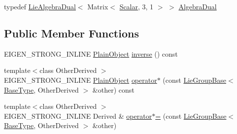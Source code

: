 \begin{DoxyCompactItemize}
\item 
typedef \hyperlink{class_lie_algebra_dual}{Lie\+Algebra\+Dual}$<$ Matrix$<$ \hyperlink{class_lie_group_base_3_01_quaternion_3_01typename_01internal_1_1traits_3_01_derived_01_4_1_1_scalar_01_4_00_01_derived_01_4_afadeceb3b98e52deecc572e71efb82a8}{Scalar}, 3, 1 $>$ $>$ \hyperlink{class_lie_group_base_3_01_quaternion_3_01typename_01internal_1_1traits_3_01_derived_01_4_1_1_scalar_01_4_00_01_derived_01_4_a2ae739f86fece047d4d480127d5b5d55}{Algebra\+Dual}
\end{DoxyCompactItemize}
\subsection*{Public Member Functions}
\begin{DoxyCompactItemize}
\item 
E\+I\+G\+E\+N\+\_\+\+S\+T\+R\+O\+N\+G\+\_\+\+I\+N\+L\+I\+NE \hyperlink{class_lie_group_base_3_01_quaternion_3_01typename_01internal_1_1traits_3_01_derived_01_4_1_1_scalar_01_4_00_01_derived_01_4_aadda973938291d3ccd25e606c6333a27}{Plain\+Object} \hyperlink{class_lie_group_base_3_01_quaternion_3_01typename_01internal_1_1traits_3_01_derived_01_4_1_1_scalar_01_4_00_01_derived_01_4_a676cfe6122660901eb50d0906d410812}{inverse} () const
\item 
{\footnotesize template$<$class Other\+Derived $>$ }\\E\+I\+G\+E\+N\+\_\+\+S\+T\+R\+O\+N\+G\+\_\+\+I\+N\+L\+I\+NE \hyperlink{class_lie_group_base_3_01_quaternion_3_01typename_01internal_1_1traits_3_01_derived_01_4_1_1_scalar_01_4_00_01_derived_01_4_aadda973938291d3ccd25e606c6333a27}{Plain\+Object} \hyperlink{class_lie_group_base_3_01_quaternion_3_01typename_01internal_1_1traits_3_01_derived_01_4_1_1_scalar_01_4_00_01_derived_01_4_ae0f90a992d5c96f69839a1f77bf95299}{operator$\ast$} (const \hyperlink{class_lie_group_base}{Lie\+Group\+Base}$<$ \hyperlink{class_lie_group_base_3_01_quaternion_3_01typename_01internal_1_1traits_3_01_derived_01_4_1_1_scalar_01_4_00_01_derived_01_4_a1a65624391a6a8eb63eb312f919c4855}{Base\+Type}, Other\+Derived $>$ \&other) const
\item 
{\footnotesize template$<$class Other\+Derived $>$ }\\E\+I\+G\+E\+N\+\_\+\+S\+T\+R\+O\+N\+G\+\_\+\+I\+N\+L\+I\+NE Derived \& \hyperlink{class_lie_group_base_3_01_quaternion_3_01typename_01internal_1_1traits_3_01_derived_01_4_1_1_scalar_01_4_00_01_derived_01_4_aa314e56672ce42df6f88b1cd36305908}{operator$\ast$=} (const \hyperlink{class_lie_group_base}{Lie\+Group\+Base}$<$ \hyperlink{class_lie_group_base_3_01_quaternion_3_01typename_01internal_1_1traits_3_01_derived_01_4_1_1_scalar_01_4_00_01_derived_01_4_a1a65624391a6a8eb63eb312f919c4855}{Base\+Type}, Other\+Derived $>$ \&other)

\end{DoxyCompactItemize}
